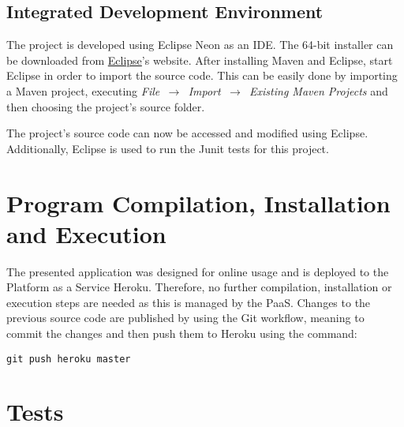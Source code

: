 \subsection{Integrated Development Environment}
The project is developed using Eclipse Neon as an IDE. The 64-bit installer can be downloaded from \hyperlink{https://www.eclipse.org/downloads/}{Eclipse}'s website. 
After installing Maven and Eclipse, start Eclipse in order to import the source code. This can be easily done by importing a Maven project, executing \textit{File $\,\to\,$ Import $\,\to\,$ Existing Maven Projects} and then choosing the project's source folder.
 
The project’s source code can now be accessed and modified using Eclipse. Additionally, Eclipse is used to run the Junit tests for this project.

\section{Program Compilation, Installation and Execution}
The presented application was designed for online usage and is deployed to the Platform as a Service Heroku.  Therefore, no further compilation, installation or execution steps are needed as this is managed by the PaaS. Changes to the previous source code are published by using the Git workflow, meaning to commit the changes and then push them to Heroku using the command:
\begin{lstlisting}
git push heroku master
\end{lstlisting}

\section{Tests}
